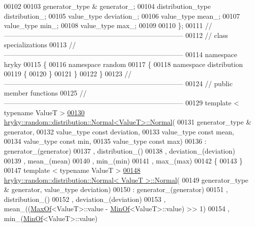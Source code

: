 \begin{DoxyCode}
00102 
00103     generator\_type &        generator\_;
00104     distribution\_type       distribution\_;
00105     value\_type              deviation\_;
00106     value\_type              mean\_;
00107     value\_type              min\_;
00108     value\_type              max\_;
00109 
00110 \};
00111 \textcolor{comment}{//
      ------------------------------------------------------------------------------}
00112 \textcolor{comment}{// class specializations}
00113 \textcolor{comment}{//
      ------------------------------------------------------------------------------}
00114 \textcolor{keyword}{namespace }hryky
00115 \{
00116 \textcolor{keyword}{namespace }random
00117 \{
00118 \textcolor{keyword}{namespace }distribution
00119 \{
00120 \}
00121 \}
00122 \}
00123 \textcolor{comment}{//
      ------------------------------------------------------------------------------}
00124 \textcolor{comment}{// public member functions}
00125 \textcolor{comment}{//
      ------------------------------------------------------------------------------}
00129 \textcolor{comment}{}\textcolor{keyword}{template} < \textcolor{keyword}{typename} ValueT >
\hypertarget{random__distribution__normal_8h_source_l00130}{}\hyperlink{classhryky_1_1random_1_1distribution_1_1_normal_a5fc939a1ad84bf2f51904a0df2463dbe}{00130} \hyperlink{classhryky_1_1random_1_1distribution_1_1_normal}{hryky::random::distribution::Normal<ValueT>::Normal}(
00131     generator\_type & generator,
00132     value\_type \textcolor{keyword}{const} deviation,
00133     value\_type \textcolor{keyword}{const} mean,
00134     value\_type \textcolor{keyword}{const} min,
00135     value\_type \textcolor{keyword}{const} max)
00136     : generator\_(generator)
00137       , distribution\_()
00138       , deviation\_(deviation)
00139       , mean\_(mean)
00140       , min\_(min)
00141       , max\_(max)
00142 \{
00143 \}
00147 \textcolor{keyword}{template} < \textcolor{keyword}{typename} ValueT >
\hypertarget{random__distribution__normal_8h_source_l00148}{}\hyperlink{classhryky_1_1random_1_1distribution_1_1_normal_a3c4d62bf2fe6b4411a20d68a6c8f3da9}{00148} \hyperlink{classhryky_1_1random_1_1distribution_1_1_normal}{hryky::random::distribution::Normal< ValueT >::Normal}(
00149     generator\_type & generator, value\_type deviation)
00150     : generator\_(generator)
00151       , distribution\_()
00152       , deviation\_(deviation)
00153       , mean\_((\hyperlink{classhryky_1_1_max_of}{MaxOf}<ValueT>::value - \hyperlink{classhryky_1_1_min_of}{MinOf}<ValueT>::value) >> 1)
00154       , min\_(\hyperlink{classhryky_1_1_min_of}{MinOf}<ValueT>::value)

\end{DoxyCode}
